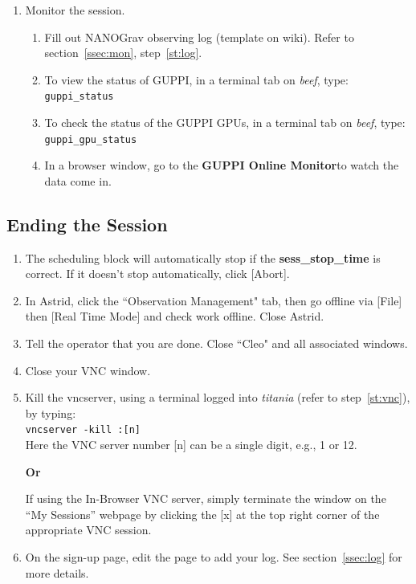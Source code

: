 \documentclass[11pt, reqno, tbtags]{article}
\begin{document}
\begin{enumerate}
 \item Monitor the session. \begin{enumerate} %
  \item Fill out NANOGrav observing log (template on wiki\footnotemark[1]). Refer to section~\ref{ssec:mon}, step~\ref{st:log}. %

  \item To view the status of GUPPI, in a terminal tab on \textit{beef}, type: \\ %
  \texttt{guppi\_status}

  \item To check the status of the GUPPI GPUs, in a terminal tab on \textit{beef}, type: \\ %
  \texttt{guppi\_gpu\_status}

  \item In a browser window, go to the \textbf{GUPPI Online Monitor}\footnotemark[5] to watch the data come in.  %
 \end{enumerate}
\end{enumerate}

\subsection{Ending the Session}\label{ssec:qc} %
\begin{enumerate}
 \item The scheduling block will automatically stop if the \textbf{sess\_stop\_time} is correct.  If it doesn't stop automatically, click [Abort].  

 \item In Astrid, click the ``Observation Management" tab, then go offline via [File] then [Real Time Mode] and check work offline.  Close Astrid.  

 \item Tell the operator that you are done.  Close ``Cleo" and all associated windows.  

 \item Close your VNC window. 

 \item Kill the vncserver, using a terminal logged into \textit{titania} (refer to step~\ref{st:vnc}), by typing: \\                   
 \texttt{vncserver -kill :[n]} \\
 Here the VNC server number [n] can be a single digit, e.g., 1 or 12.
 \begin{center} {\bfseries{Or}} \end{center} 
If using the In-Browser VNC server, simply terminate the window on the ``My Sessions'' webpage by clicking the [x] at the top right corner of the appropriate VNC session.


 \item On the sign-up page\footnotemark[1], edit the page to add your log.  See section~\ref{ssec:log} for more details. 

\end{enumerate}
\end{document}
